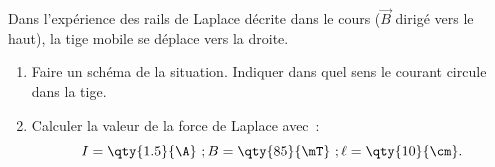 Dans l'expérience des rails de Laplace décrite dans le cours ($\vec{B}$ dirigé
vers le haut), la tige mobile se déplace vers la droite.

\begin{enumerate}
    \item Faire un schéma de la situation. Indiquer dans quel sens le courant
          circule dans la tige.
    \item Calculer la valeur de la force de Laplace avec~:
          \[
              I=\qty{1.5}{\A}~; B=\qty{85}{\mT}~; \ell=\qty{10}{\cm}.
          \]
\end{enumerate}


